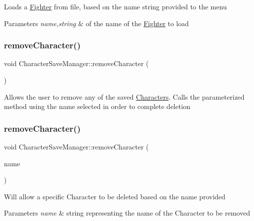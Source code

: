 Loads a \hyperlink{class_fighter}{Fighter} from file, based on the name string provided to the menu 
\begin{DoxyParams}{Parameters}
{\em name,string} & of the name of the \hyperlink{class_fighter}{Fighter} to load \\
\hline
\end{DoxyParams}
\hypertarget{class_character_save_manager_af8ee3fecc5c19f1f61f98e9132a26b5f}{}\label{class_character_save_manager_af8ee3fecc5c19f1f61f98e9132a26b5f} 
\subsubsection{\texorpdfstring{remove\+Character()}{removeCharacter()}\hspace{0.1cm}{\footnotesize\ttfamily [1/2]}}
{\footnotesize\ttfamily void Character\+Save\+Manager\+::remove\+Character (\begin{DoxyParamCaption}{ }\end{DoxyParamCaption})\hspace{0.3cm}{\ttfamily [static]}}

Allows the user to remove any of the saved \hyperlink{class_characters}{Characters}. Calls the parameterized method using the name selected in order to complete deletion \hypertarget{class_character_save_manager_a49dd1eedbdf0e2b7cedfba64d4fb8d53}{}\label{class_character_save_manager_a49dd1eedbdf0e2b7cedfba64d4fb8d53} 
\subsubsection{\texorpdfstring{remove\+Character()}{removeCharacter()}\hspace{0.1cm}{\footnotesize\ttfamily [2/2]}}
{\footnotesize\ttfamily void Character\+Save\+Manager\+::remove\+Character (\begin{DoxyParamCaption}\item[{string}]{name }\end{DoxyParamCaption})\hspace{0.3cm}{\ttfamily [static]}}

Will allow a specific Character to be deleted based on the name provided 
\begin{DoxyParams}{Parameters}
{\em name} & string representing the name of the Character to be removed \\
\hline
\end{DoxyParams}
\hypertarget{class_character_save_manager_a4cb417d00055faa42333a69d64b29da6}{}\label{class_character_save_manager_a4cb417d00055faa42333a69d64b29da6} 
